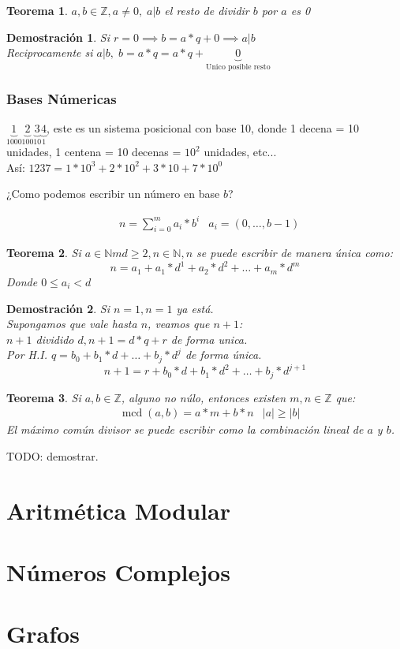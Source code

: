 \documentclass[9pt,a4paper,draft]{article}
\theoremstyle{definition}
\theoremstyle{plain}
\newtheorem{teo}{Teorema}
\newtheorem{demo}{Demostración}[teo]
\DeclareMathOperator{\mcd}{mcd}
\begin{document}
\begin{teo} $a,b\in{\mathbb{Z}}, a\neq{0},\; a|b$ el resto de dividir $b$ por $a$ es 0\end{teo}
\begin{demo} 
Si $r=0 \implies b=a*q+0 \implies a|b$ \\
Reciprocamente si $a|b,\; b=a*q=a*q+\underbrace{0}_\text{Unico posible resto}$
\end{demo}

\section{Bases Númericas}

$\underbrace{1}_{1000}\underbrace{2}_{100}\underbrace{3}_{10}\underbrace{4}_{1}$, este es un sistema posicional con base 10, donde 1 decena = 10 unidades, 1 centena = 10 decenas = $10^2$ unidades, etc...\\

Así: $1237 = 1*10^3+2*10^2+3*10+7*10^0$

¿Como podemos escribir un número en base $b$?

\begin{align*} & n=\displaystyle\sum_{i=0}^{m}a_i*b^i & a_i=(0, \dots, b-1)\end{align*}

\begin{teo} Si $a\in{\mathbb{N}}m d\geq2, n\in{\mathbb{N}}, n$ se puede escribir de manera única como:
$$n = a_1 + a_1*d^1 + a_2*d^2 + \dots + a_m*d^m$$
Donde $0\leq{a_i}<d$
\end{teo}
\begin{demo}
Si $n=1, n=1$ ya está.\\
Supongamos que vale hasta $n$, veamos que $n+1$:\\
$n+1$ dividido $d, n+1=d*q+r$ de forma unica.\\
Por H.I. $q=b_0+b_1*d+\dots+b_j*d^j$ de forma única.\\
$$n+1 = r + b_0*d + b_1*d^2 + \dots + b_j*d^{j+1}$$
\end{demo}

\begin{teo} \label{teoeuclides} Si $a,b\in{\mathbb{Z}}$, alguno no núlo, entonces existen $m,n\in{\mathbb{Z}}$ que:\\
\begin{align*} & \mcd(a,b) = a*m+b*n & |a|\geq|b| \end{align*}
El máximo común divisor se puede escribir como la combinación lineal de $a$ y $b$.
\end{teo}

TODO: demostrar.
\part{Aritmética Modular}

\part{Números Complejos}

\part{Grafos}
\end{document}
